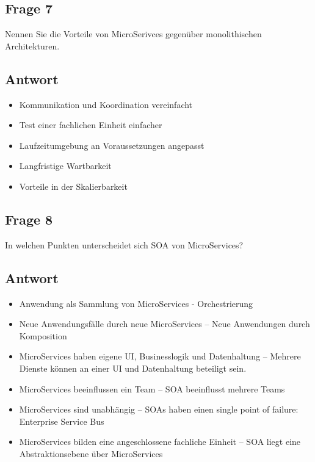 \subsection*{Frage 7}
Nennen Sie die Vorteile von MicroSerivces gegenüber monolithischen Architekturen.
\subsection*{Antwort}
\begin{itemize}
\item Kommunikation und Koordination vereinfacht
\item Test einer fachlichen Einheit einfacher
\item Laufzeitumgebung an Voraussetzungen angepasst
\item Langfristige Wartbarkeit
\item Vorteile in der Skalierbarkeit
\end{itemize}
\subsection*{Frage 8}
In welchen Punkten unterscheidet sich SOA von MicroServices?
\subsection*{Antwort}
\begin{itemize}
\item Anwendung als Sammlung von MicroServices - Orchestrierung
\item Neue Anwendungsfälle durch neue MicroServices – Neue Anwendungen durch Komposition
\item MicroServices haben eigene UI, Businesslogik und Datenhaltung – Mehrere Dienste können an einer UI und Datenhaltung beteiligt sein.
\item MicroServices beeinflussen ein Team – SOA beeinflusst mehrere Teams
\item MicroServices sind unabhängig – SOAs haben einen single point of failure: Enterprise Service Bus
\item MicroServices bilden eine angeschlossene fachliche Einheit – SOA liegt eine Abstraktionsebene über MicroServices
\end{itemize}